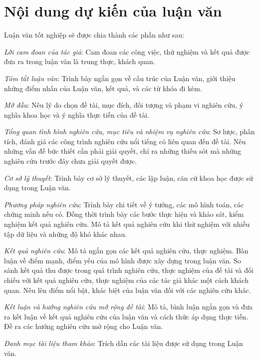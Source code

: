 
\section{\texorpdfstring{Nội dung dự kiến của luận văn}{Conclusion}}

Luận văn tốt nghiệp sẽ được chia thành các phần như sau:

\textit{Lời cam đoan của tác giả}: Cam đoan các công việc, thử nghiệm và kết quả được đưa ra trong luận văn là trung thực, khách quan.

\textit{Tóm tắt luận văn}: Trình bày ngắn gọn về cấu trúc của Luận văn, giới thiệu những điểm nhấn của Luận văn, kết quả, và các từ khóa đi kèm.

\textit{Mở đầu}: Nêu lý do chọn đề tài, mục đích, đối tượng và phạm vi nghiên cứu, ý nghĩa khoa học và ý nghĩa thực tiễn của đề tài.

\textit{Tổng quan tình hình nghiên cứu, mục tiêu và nhiệm vụ nghiên cứu}: Sơ lược, phân tích, đánh giá các công trình nghiên cứu nổi tiếng có liên quan đến đề tài. Nêu những vấn đề bức thiết cần phải giải quyết, chỉ ra những thiếu sót mà những nghiên cứu trước đây chưa giải quyết được.

\textit{Cơ sở lý thuyết}: Trình bày cơ sở lý thuyết, các lập luận, căn cứ khoa học được sử dụng trong Luận văn.

\textit{Phương pháp nghiên cứu}: Trình bày chi tiết về ý tưởng, các mô hình toán, các chứng minh nếu có. Đồng thời trình bày các bước thực hiện và khảo sát, kiểm nghiệm kết quả nghiên cứu. Mô tả kết quả nghiên cứu khi thử nghiệm với nhiều tập dữ liệu và những độ khó khác nhau.

\textit{Kết quả nghiên cứu}: Mô tả ngắn gọn các kết quả nghiên cứu, thực nghiệm. Bàn luận về điểm mạnh, điểm yếu của mô hình được xây dựng trong luận văn. So sánh kết quả thu được trong quá trình nghiên cứu, thực nghiệm của đề tài và đối chiếu với kết quả nghiên cứu, thực nghiệm của các tác giả khác một cách khách quan. Nêu lên điểm nổi bật, khác biệt của luận văn đối với các nghiên cứu khác.

\textit{Kết luận và hướng nghiên cứu mở rộng đề tài}: Mô tả, bình luận ngắn gọn và đưa ra kết luận về kết quả nghiên cứu của luận văn và cách thức áp dụng thực tiễn. Đề ra các hướng nghiên cứu mở rộng cho Luận văn.

\textit{Danh mục tài liệu tham khảo}: Trích dẫn các tài liệu được sử dụng trong Luận văn.
